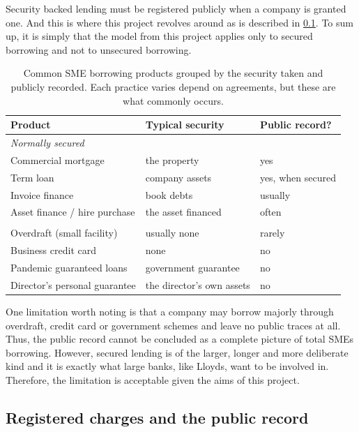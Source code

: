 \documentclass[ %
                    author={Natchalin Iwsakul \\[0.4em] Inkaphol Siriwongwattana \\[0.4em] Tanaphan Kummaraphat \\[0.6em] Patorn Srisupap},,
                supervisor={Fernando Moreno-Pino},
                    degree={MSc},
                     title={Propensity Modelling for SME Commercial Lending Using Open Public Data
},
                  subtitle={Companies House and GDELT as predictors of first-time borrowing},
                      type={},
                      year={2026}]{dissertation}
\begin{document}
Security backed lending must be registered publicly when a company is granted one. And this is where this project revolves around as is described in \ref{sec:charges}. To sum up, it is simply that the model from this project applies only to secured borrowing and not to unsecured borrowing.

\begin{table}[H]
\centering
\begin{tabular}{lll}
\toprule
Product & Typical security & Public record? \\
\midrule
\multicolumn{3}{l}{\itshape Normally secured} \\
Commercial mortgage            & the property         & yes \\
Term loan                      & company assets       & yes, when secured \\
Invoice finance                & book debts           & usually \\
Asset finance / hire purchase  & the asset financed   & often \\
\addlinespace
\multicolumn{3}{l}{\itshape Normally unsecured} \\
Overdraft (small facility)     & usually none              & rarely \\
Business credit card           & none                      & no \\
Pandemic guaranteed loans      & government guarantee      & no \\
Director's personal guarantee  & the director's own assets & no \\
\bottomrule
\end{tabular}
\caption[SME borrowing products and the public record]{Common SME borrowing
products grouped by the security taken and publicly recorded. Each practice varies depend on agreements, but these are what commonly occurs.}
\label{tab:products}
\end{table}

One limitation worth noting is that a company may borrow majorly through overdraft, credit card or government schemes and leave no public traces at all. Thus, the public record cannot be concluded as a complete picture of total SMEs borrowing. However, secured lending is of the larger, longer and more deliberate kind and it is exactly what large banks, like Lloyds, want to be involved in. Therefore, the limitation is acceptable given the aims of this project.

\subsection{Registered charges and the public record}
\label{sec:charges}
\end{document}

